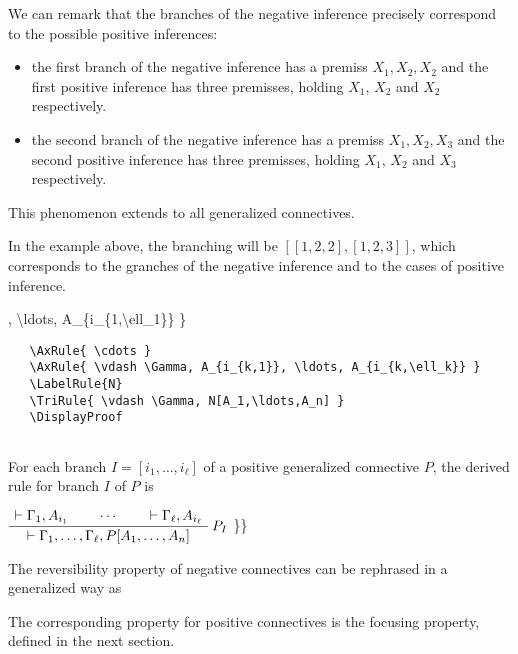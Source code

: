 We can remark that the branches of the negative inference precisely
correspond to the possible positive inferences:

\begin{itemize}
\tightlist
\item
  the first branch of the negative inference has a premiss
  \(X_1,X_2,X_2\) and the first positive inference has three premisses,
  holding \(X_1\), \(X_2\) and \(X_2\) respectively.
\item
  the second branch of the negative inference has a premiss
  \(X_1,X_2,X_3\) and the second positive inference has three premisses,
  holding \(X_1\), \(X_2\) and \(X_3\) respectively.
\end{itemize}

This phenomenon extends to all generalized connectives.

In the example above, the branching will be \([[1,2,2],[1,2,3]]\), which
corresponds to the granches of the negative inference and to the cases
of positive inference.

, \textbackslash{}ldots, A\_\{i\_\{1,\textbackslash{}ell\_1\}\} \}

\texttt{~~~\textbackslash{}AxRule\{~\textbackslash{}cdots~\}}\\
\texttt{~~~\textbackslash{}AxRule\{~\textbackslash{}vdash~\textbackslash{}Gamma,~A\_\{i\_\{k,1\}\},~\textbackslash{}ldots,~A\_\{i\_\{k,\textbackslash{}ell\_k\}\}~\}}\\
\texttt{~~~\textbackslash{}LabelRule\{N\}}\\
\texttt{~~~\textbackslash{}TriRule\{~\textbackslash{}vdash~\textbackslash{}Gamma,~N{[}A\_1,\textbackslash{}ldots,A\_n{]}~\}}\\
\texttt{~~~\textbackslash{}DisplayProof}\\
\texttt{~}

For each branch \(I=[i_1,\ldots,i_\ell]\) of a positive generalized
connective \(P\), the derived rule for branch \(I\) of \(P\) is

\(\AxRule{ \vdash \Gamma_1, A_{i_1} }
    \AxRule{ \cdots }
    \AxRule{ \vdash \Gamma_\ell, A_{i_\ell} }
    \LabelRule{P_I}
    \TriRule{ \vdash \Gamma_1, \ldots, \Gamma_\ell, P[A_1,\ldots,A_n] }
    \DisplayProof\) \}\}

The reversibility property of negative connectives can be rephrased in a
generalized way as

The corresponding property for positive connectives is the focusing
property, defined in the next section.

